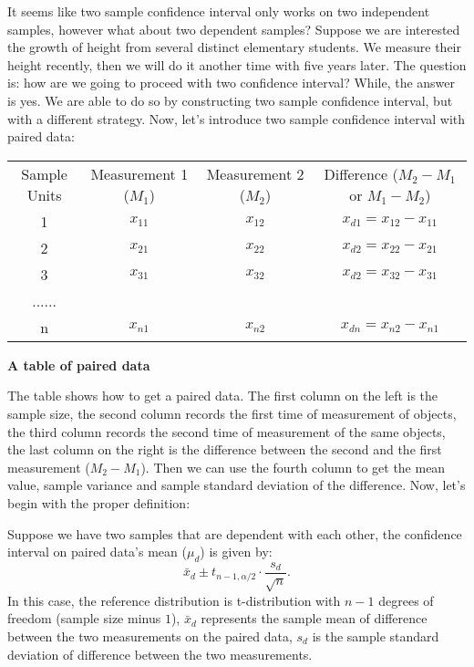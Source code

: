 It seems like two sample confidence interval only works on two independent samples, however what about two dependent samples? Suppose we are interested the growth of height from several distinct elementary students. We measure their height recently, then we will do it another time with five years later. The question is: how are we going to proceed with two confidence interval? While, the answer is yes. We are able to do so by constructing two sample confidence interval, but with a different strategy. Now, let's introduce two sample confidence interval with paired data:

\begin{center}
\begin{tabular}{ c c c c }
 Sample Units & Measurement 1 ($M_1$) & Measurement 2 ($M_2$) & Difference ($M_2 - M_1$ or $M_1 - M_2$)\\ 
 1 & $x_{11}$ & $x_{12}$ & $x_{d1} = x_{12} -  x_{11}$\\  
 2 & $x_{21}$ & $x_{22}$ & $x_{d2} = x_{22} -  x_{21}$\\
 3 & $x_{31}$ & $x_{32}$ & $x_{d2} = x_{32} -  x_{31}$\\
 ......\\
 n & $x_{n1}$ & $x_{n2}$ & $x_{dn} = x_{n2} -  x_{n1}$\\
\end{tabular}
\small\textbf{A table of paired data}\\
\end{center}

The table shows how to get a paired data. The first column on the left is the sample size, the second column records the first time of measurement of objects, the third column records the second time of measurement of the same objects, the last column on the right is the difference between the second and the first measurement ($M_2 - M_1$). Then we can use the fourth column to get the mean value, sample variance and sample standard deviation of the difference. Now, let's begin with the proper definition:

\begin{definition}
Suppose we have two samples that are dependent with each other, the confidence interval on paired data's mean ($\mu_d$) is given by: \[ \bar{x}_d  \pm t_{n-1, \alpha/2} \cdot \frac{s_d}{\sqrt{n}}.\]
In this case, the reference distribution is t-distribution with $n-1$ degrees of freedom (sample size minus $1$), $\bar{x}_d$ represents the sample mean of difference between the two measurements on the paired data, $s_d$ is the sample standard deviation of difference between the two measurements.
\end{definition}

